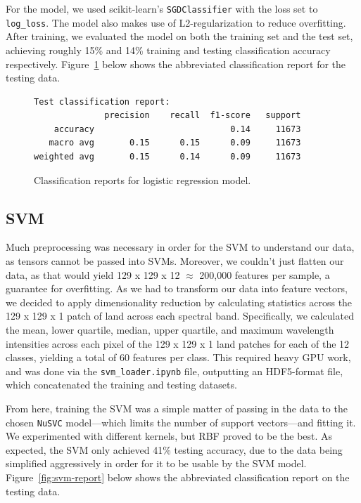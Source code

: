 \documentclass[12pt]{article}
\begin{document}
For the model, we used scikit-learn's \texttt{SGDClassifier} with the loss set to \texttt{log\_loss}.
The model also makes use of L2-regularization to reduce overfitting.
After training, we evaluated the model on both the training set and the test set, achieving roughly 15\% and 14\% training and testing classification accuracy respectively.
Figure~\ref{fig:log-reg-report} below shows the abbreviated classification report for the testing data.

\begin{figure}[htbp]
  \centering
  \begin{minipage}{0.7\textwidth}
    \begin{lstlisting}[label={lst:log-reg-output}]
Test classification report:
              precision    recall  f1-score   support
    accuracy                           0.14     11673
   macro avg       0.15      0.15      0.09     11673
weighted avg       0.15      0.14      0.09     11673\end{lstlisting}
  \end{minipage}
  \caption{Classification reports for logistic regression model.}
  \label{fig:log-reg-report}
\end{figure}

\subsection{SVM}
\label{subsec:svm-architecture}
Much preprocessing was necessary in order for the SVM to understand our data, as tensors cannot be passed into SVMs. Moreover, we couldn't just flatten our data, as that would yield 129 x 129 x 12 $\approx$ 200,000 features per sample, a guarantee for overfitting.
As we had to transform our data into feature vectors, we decided to apply dimensionality reduction by calculating statistics across the 129 x 129 x 1 patch of land across each spectral band.
Specifically, we calculated the mean, lower quartile, median, upper quartile, and maximum wavelength intensities across each pixel of the 129 x 129 x 1 land patches for each of the 12 classes, yielding a total of 60 features per class.
This required heavy GPU work, and was done via the \texttt{svm\_loader.ipynb} file, outputting an HDF5-format file, which concatenated the training and testing datasets.

From here, training the SVM was a simple matter of passing in the data to the chosen \texttt{NuSVC} model—which limits the number of support vectors—and fitting it.
We experimented with different kernels, but RBF proved to be the best.
As expected, the SVM only achieved 41\% testing accuracy, due to the data being simplified aggressively in order for it to be usable by the SVM model.
Figure~\ref{fig:svm-report} below shows the abbreviated classification report on the testing data.
\end{document}
